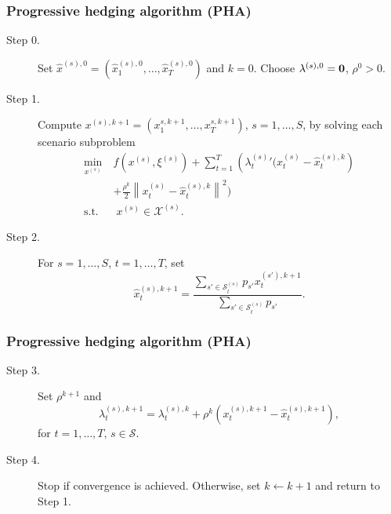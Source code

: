 \documentclass[french]{beamer}
\def\cS{\mathcal{S}}
\begin{document}
\begin{frame}
\frametitle{Progressive hedging algorithm (PHA)}

\begin{description}
	\item[Step 0.]
	Set $\hat{x}^{(s) ,0} = \left(\hat{x}_1^{(s),0}, \dots, \hat{x}_T^{(s),0}\right)$ and $k = 0$. Choose $\lambda^{(s),0} = \bf{0}$, $\rho^0 > 0$.
	\item[Step 1.]
	Compute $x^{(s),k+1} =  (x_1^{s,k+1}, \dots, x_T^{s,k+1})$, $s = 1,\ldots,S$, by solving each scenario subproblem
	$$
	\begin{aligned}
	\min_{x^{(s)}} \ &  f\left( x^{(s)}, \xi^{(s)} \right) + \sum_{t = 1}^T \left( {\lambda_t^{(s)}}' \biggl(x_t^{(s)} - \hat{x}_t^{(s),k}\right) \\
	& + \frac{\rho^k}{2} \left\| x_t^{(s)} - \hat{x}_t^{(s),k} \right\|^2 \biggr)\\
	\text{s.t.} & \; x^{(s)}  \in \mathcal{X}^{(s)}.
	\end{aligned}
	$$
	\item[Step 2.]
	For $s = 1,\ldots,S$, $t = 1,\ldots,T$, set
	\[
	\hat{x}_t^{(s),k+1} = \frac{\sum_{s' \in \cS_{t}^{(s)}} p_{s'} x_t^{(s'),k+1}}{\sum_{s' \in \cS_t^{(s)}} p_{s'}}.
	\]
\end{description}

\end{frame}

\begin{frame}
\frametitle{Progressive hedging algorithm (PHA)}

\begin{description}
	\item[Step 3.]
	Set $\rho^{k+1}$ and
	\[
	\lambda_t^{(s), k+1} =  \lambda_t^{(s),k} + \rho^k \left( x_t^{(s),k+1} -  \hat{x}_t^{(s),k+1}  \right),
	\]
	for $t = 1, \dots, T, \, s \in \mathcal{S}$.
	\item[Step 4.]
	Stop if convergence is achieved.
	Otherwise, set $k \leftarrow k + 1$ and return to Step 1.
\end{description}

\end{frame}
\end{document}
